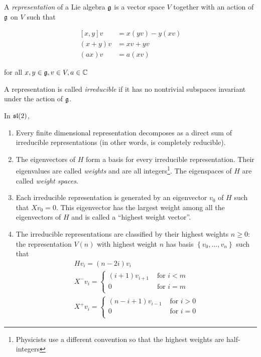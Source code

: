 A \emph{representation} of a Lie algebra $\mathfrak{g}$ is a vector space $V$
together with an action of $\mathfrak{g}$ on $V$ such that 

\begin{align*}
    \left[ x,y \right] v &= x(yv) - y(xv) \\
    (x+y)v &= xv + yv \\
    (ax)v &= a(xv)
\end{align*}

for all $x,y \in \mathfrak{g}, v \in V, a \in \mathbb{C}$

A representation is called \emph{irreducible} if it has no
nontrivial subspaces invariant under the action of $\mathfrak{g}$.

In $\mathfrak{sl}(2)$,
\begin{enumerate}
    \item Every finite dimensional representation decomposes as a direct sum of
          irreducible representations (in other words, is completely reducible).
    \item The eigenvectors of $H$ form a basis for every irreducible
          representation. Their eigenvalues are called \emph{weights} and are
          all integers\footnote{Physicists use a different convention so that the highest weights are half-integers}. The eigenspaces of $H$ are called \emph{weight spaces}.  
    \item Each irreducible representation is generated by an eigenvector $v_0$
        of $H$ such that $Xv_0 = 0$. This eigenvector has the largest weight
        among all the eigenvectors of $H$ and is called a ``highest weight
        vector''.
    \item The irreducible representations are classified by their highest
          weights $n \geq 0$: the representation $V(n)$ with highest weight $n$
          has basis $\left\{ v_0, \ldots, v_n \right\}$ such that 
\begin{align*}
    &H v_i = (n - 2i) v_i& \\
    &X^- v_i = \begin{cases} 
                (i+1)v_{i+1}& \text{ for $i < m$} \\
                0& \text{ for $i = m$} \\
            \end{cases} \\
    &X^+ v_i = \begin{cases} 
                (n-i+1)v_{i-1}& \text{ for $i > 0$} \\
                0& \text{ for $i = 0$} \\
            \end{cases}
\end{align*}
\end{enumerate}


